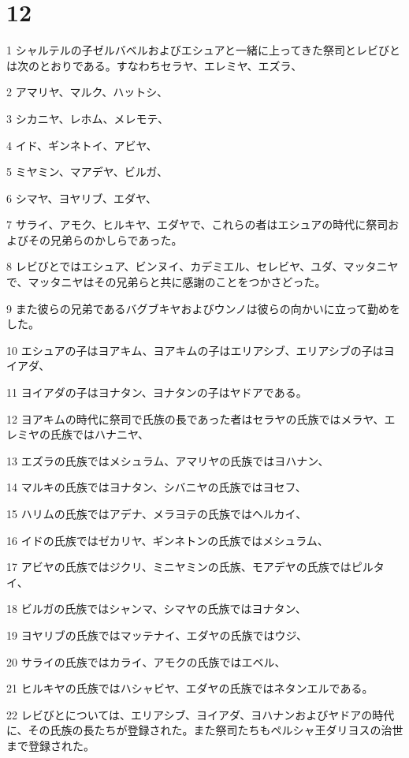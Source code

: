 \chapter{12}

\par 1 シャルテルの子ゼルバベルおよびエシュアと一緒に上ってきた祭司とレビびとは次のとおりである。すなわちセラヤ、エレミヤ、エズラ、
\par 2 アマリヤ、マルク、ハットシ、
\par 3 シカニヤ、レホム、メレモテ、
\par 4 イド、ギンネトイ、アビヤ、
\par 5 ミヤミン、マアデヤ、ビルガ、
\par 6 シマヤ、ヨヤリブ、エダヤ、
\par 7 サライ、アモク、ヒルキヤ、エダヤで、これらの者はエシュアの時代に祭司およびその兄弟らのかしらであった。
\par 8 レビびとではエシュア、ビンヌイ、カデミエル、セレビヤ、ユダ、マッタニヤで、マッタニヤはその兄弟らと共に感謝のことをつかさどった。
\par 9 また彼らの兄弟であるバグブキヤおよびウンノは彼らの向かいに立って勤めをした。
\par 10 エシュアの子はヨアキム、ヨアキムの子はエリアシブ、エリアシブの子はヨイアダ、
\par 11 ヨイアダの子はヨナタン、ヨナタンの子はヤドアである。
\par 12 ヨアキムの時代に祭司で氏族の長であった者はセラヤの氏族ではメラヤ、エレミヤの氏族ではハナニヤ、
\par 13 エズラの氏族ではメシュラム、アマリヤの氏族ではヨハナン、
\par 14 マルキの氏族ではヨナタン、シバニヤの氏族ではヨセフ、
\par 15 ハリムの氏族ではアデナ、メラヨテの氏族ではヘルカイ、
\par 16 イドの氏族ではゼカリヤ、ギンネトンの氏族ではメシュラム、
\par 17 アビヤの氏族ではジクリ、ミニヤミンの氏族、モアデヤの氏族ではピルタイ、
\par 18 ビルガの氏族ではシャンマ、シマヤの氏族ではヨナタン、
\par 19 ヨヤリブの氏族ではマッテナイ、エダヤの氏族ではウジ、
\par 20 サライの氏族ではカライ、アモクの氏族ではエベル、
\par 21 ヒルキヤの氏族ではハシャビヤ、エダヤの氏族ではネタンエルである。
\par 22 レビびとについては、エリアシブ、ヨイアダ、ヨハナンおよびヤドアの時代に、その氏族の長たちが登録された。また祭司たちもペルシャ王ダリヨスの治世まで登録された。
